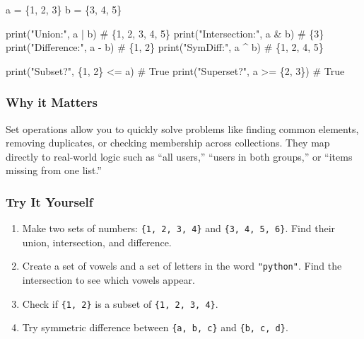 \documentclass[
  letterpaper,
  DIV=11,
  numbers=noendperiod]{scrreprt}
\newenvironment{Shaded}{\begin{snugshade}}{\end{snugshade}}
\newcommand{\BuiltInTok}[1]{\textcolor[rgb]{0.00,0.23,0.31}{#1}}
\newcommand{\CommentTok}[1]{\textcolor[rgb]{0.37,0.37,0.37}{#1}}
\newcommand{\DecValTok}[1]{\textcolor[rgb]{0.68,0.00,0.00}{#1}}
\newcommand{\NormalTok}[1]{\textcolor[rgb]{0.00,0.23,0.31}{#1}}
\newcommand{\OperatorTok}[1]{\textcolor[rgb]{0.37,0.37,0.37}{#1}}
\newcommand{\StringTok}[1]{\textcolor[rgb]{0.13,0.47,0.30}{#1}}
\providecommand{\tightlist}{%
  \setlength{\itemsep}{0pt}\setlength{\parskip}{0pt}}
\begin{document}
\begin{Shaded}
\begin{Highlighting}[]
\NormalTok{a }\OperatorTok{=}\NormalTok{ \{}\DecValTok{1}\NormalTok{, }\DecValTok{2}\NormalTok{, }\DecValTok{3}\NormalTok{\}}
\NormalTok{b }\OperatorTok{=}\NormalTok{ \{}\DecValTok{3}\NormalTok{, }\DecValTok{4}\NormalTok{, }\DecValTok{5}\NormalTok{\}}

\BuiltInTok{print}\NormalTok{(}\StringTok{"Union:"}\NormalTok{, a }\OperatorTok{|}\NormalTok{ b)              }\CommentTok{\# \{1, 2, 3, 4, 5\}}
\BuiltInTok{print}\NormalTok{(}\StringTok{"Intersection:"}\NormalTok{, a }\OperatorTok{\&}\NormalTok{ b)       }\CommentTok{\# \{3\}}
\BuiltInTok{print}\NormalTok{(}\StringTok{"Difference:"}\NormalTok{, a }\OperatorTok{{-}}\NormalTok{ b)         }\CommentTok{\# \{1, 2\}}
\BuiltInTok{print}\NormalTok{(}\StringTok{"SymDiff:"}\NormalTok{, a }\OperatorTok{\^{}}\NormalTok{ b)            }\CommentTok{\# \{1, 2, 4, 5\}}

\BuiltInTok{print}\NormalTok{(}\StringTok{"Subset?"}\NormalTok{, \{}\DecValTok{1}\NormalTok{, }\DecValTok{2}\NormalTok{\} }\OperatorTok{\textless{}=}\NormalTok{ a)       }\CommentTok{\# True}
\BuiltInTok{print}\NormalTok{(}\StringTok{"Superset?"}\NormalTok{, a }\OperatorTok{\textgreater{}=}\NormalTok{ \{}\DecValTok{2}\NormalTok{, }\DecValTok{3}\NormalTok{\})     }\CommentTok{\# True}
\end{Highlighting}
\end{Shaded}

\subsubsection{Why it Matters}\label{why-it-matters-26}

Set operations allow you to quickly solve problems like finding common
elements, removing duplicates, or checking membership across
collections. They map directly to real-world logic such as ``all
users,'' ``users in both groups,'' or ``items missing from one list.''

\subsubsection{Try It Yourself}\label{try-it-yourself-26}

\begin{enumerate}
\def\labelenumi{\arabic{enumi}.}
\tightlist
\item
  Make two sets of numbers: \texttt{\{1,\ 2,\ 3,\ 4\}} and
  \texttt{\{3,\ 4,\ 5,\ 6\}}. Find their union, intersection, and
  difference.
\item
  Create a set of vowels and a set of letters in the word
  \texttt{"python"}. Find the intersection to see which vowels appear.
\item
  Check if \texttt{\{1,\ 2\}} is a subset of \texttt{\{1,\ 2,\ 3,\ 4\}}.
\item
  Try symmetric difference between \texttt{\{a,\ b,\ c\}} and
  \texttt{\{b,\ c,\ d\}}.
\end{enumerate}
\end{document}
